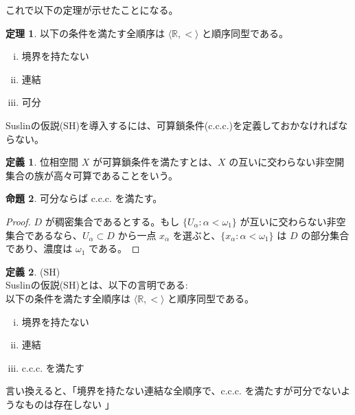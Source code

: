 \documentclass{jsarticle}
\theoremstyle{definition}
\newtheorem*{definition*}{定義}
\newtheorem{theorem}{定理}[section]
\newtheorem{proposition}[theorem]{命題}
\begin{document}
    \vspace{0.5ex}
    これで以下の定理が示せたことになる。
    \vspace{0.5ex}
    
    \begin{theorem}
        以下の条件を満たす全順序は $\langle \mathbb{R}, < \rangle$ と順序同型である。
        \begin{enumerate}[(i)]
            \item 境界を持たない
            \item 連結
            \item 可分
        \end{enumerate}
    \end{theorem}
    
    \vspace{1.5ex}
    Suslinの仮説(SH)を導入するには、可算鎖条件(c.c.c.)を定義しておかなければならない。
    \begin{definition*}
        位相空間 $X$ が可算鎖条件を満たすとは、$X$ の互いに交わらない非空開集合の族が高々可算であることをいう。
    \end{definition*}
    
    \begin{proposition}
        可分ならば c.c.c. を満たす。
    \end{proposition}
    \begin{proof}
        $D$ が稠密集合であるとする。もし $\{U_\alpha : \alpha < \omega_1\}$ が互いに交わらない非空集合であるなら、$U_\alpha \subset D$ から一点 $x_\alpha$ を選ぶと、$\{x_\alpha : \alpha < \omega_1\}$ は $D$ の部分集合であり、濃度は $\omega_1$ である。
    \end{proof}
    
    \begin{definition*} (SH)\\
        Suslinの仮説(SH)とは、以下の言明である:\\
        以下の条件を満たす全順序は $\langle \mathbb{R}, < \rangle$ と順序同型である。
        \begin{enumerate}[(i)]
            \item 境界を持たない
            \item 連結
            \item c.c.c. を満たす
        \end{enumerate}
        言い換えると、「境界を持たない連結な全順序で、c.c.c. を満たすが可分でないようなものは存在しない 」
    \end{definition*}
    
\end{document}
